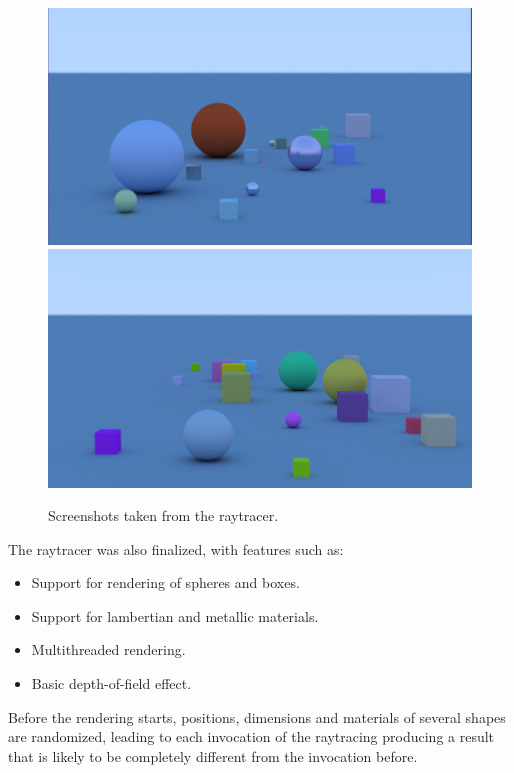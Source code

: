 \begin{figure}[H]
	\begin{center}
		\includegraphics[width=\textwidth]{./img/dunder_bild.png}
		\includegraphics[width=\textwidth]{./img/pog_bild.png}
		\caption{Screenshots taken from the raytracer.}
		\label{matsand}
	\end{center}
\end{figure}
	
The raytracer was also finalized, with features such as:

\begin{itemize}
	\item Support for rendering of spheres and boxes.
	\item Support for lambertian and metallic materials.
	\item Multithreaded rendering.
	\item Basic depth-of-field effect.
\end{itemize}

Before the rendering starts, positions, dimensions and materials of several shapes are randomized, leading to each invocation of the raytracing producing a result that is likely to be completely different from the invocation before.

